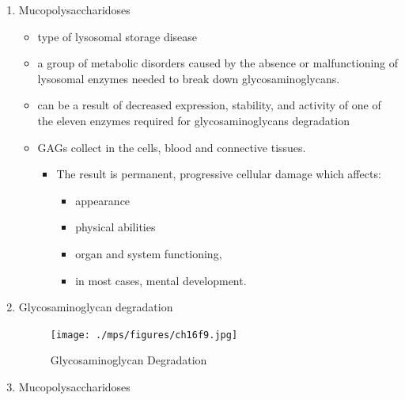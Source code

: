 \documentclass{scrartcl}
\begin{document}
\begin{enumerate}
\item Mucopolysaccharidoses
\label{sec:org82b39cf}
\begin{itemize}
\item type of lysosomal storage disease
\item a group of metabolic disorders caused by the absence or
malfunctioning of lysosomal enzymes needed to break down
glycosaminoglycans.
\item can be a result of decreased expression, stability, and activity of
one of the eleven enzymes required for glycosaminoglycans
degradation
\item GAGs collect in the cells, blood and connective tissues.
\begin{itemize}
\item The result is permanent, progressive cellular damage which affects:
\begin{itemize}
\item appearance
\item physical abilities
\item organ and system functioning,
\item in most cases, mental development.
\end{itemize}
\end{itemize}
\end{itemize}

\item Glycosaminoglycan degradation
\label{sec:orga1a435d}

\begin{figure}[htbp]
\centering
\texttt{[image: ./mps/figures/ch16f9.jpg]}
\caption[Glycosaminoglycan Degradation]{\label{fig:orge102691}
Glycosaminoglycan Degradation}
\end{figure}


\item Mucopolysaccharidoses
\label{sec:orge5e2572}


\end{enumerate}
\end{document}
